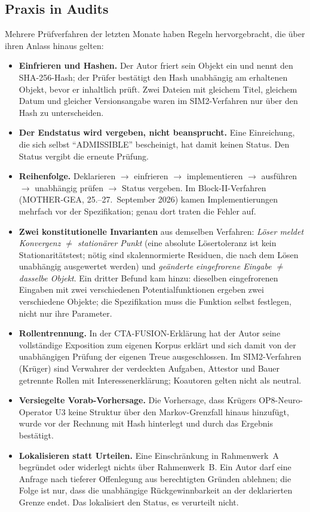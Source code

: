 \subsection{Praxis in Audits}

Mehrere Prüfverfahren der letzten Monate haben Regeln hervorgebracht, die über ihren Anlass
hinaus gelten:
\begin{itemize}
\item \textbf{Einfrieren und Hashen.} Der Autor friert sein Objekt ein und nennt den
  SHA-256-Hash; der Prüfer bestätigt den Hash unabhängig am erhaltenen Objekt, bevor er
  inhaltlich prüft. Zwei Dateien mit gleichem Titel, gleichem Datum und gleicher
  Versionsangabe waren im SIM2-Verfahren nur über den Hash zu unterscheiden.
\item \textbf{Der Endstatus wird vergeben, nicht beansprucht.} Eine Einreichung, die sich
  selbst \enquote{ADMISSIBLE} bescheinigt, hat damit keinen Status. Den Status vergibt die
  erneute Prüfung.
\item \textbf{Reihenfolge.} Deklarieren $\to$ einfrieren $\to$ implementieren $\to$ ausführen
  $\to$ unabhängig prüfen $\to$ Status vergeben. Im Block-II-Verfahren (MOTHER-GEA,
  25.--27.~September 2026) kamen Implementierungen mehrfach vor der Spezifikation; genau
  dort traten die Fehler auf.
\item \textbf{Zwei konstitutionelle Invarianten} aus demselben Verfahren: \emph{Löser meldet
  Konvergenz $\neq$ stationärer Punkt} (eine absolute Lösertoleranz ist kein
  Stationaritätstest; nötig sind skalennormierte Residuen, die nach dem Lösen unabhängig
  ausgewertet werden) und \emph{geänderte eingefrorene Eingabe $\neq$ dasselbe Objekt}.
  Ein dritter Befund kam hinzu: dieselben eingefrorenen Eingaben mit zwei verschiedenen
  Potentialfunktionen ergeben zwei verschiedene Objekte; die Spezifikation muss die
  Funktion selbst festlegen, nicht nur ihre Parameter.
\item \textbf{Rollentrennung.} In der CTA-FUSION-Erklärung hat der Autor seine vollständige
  Exposition zum eigenen Korpus erklärt und sich damit von der unabhängigen Prüfung der
  eigenen Treue ausgeschlossen. Im SIM2-Verfahren (Krüger) sind Verwahrer der verdeckten
  Aufgaben, Attestor und Bauer getrennte Rollen mit Interessenerklärung; Koautoren gelten
  nicht als neutral.
\item \textbf{Versiegelte Vorab-Vorhersage.} Die Vorhersage, dass Krügers OP8-Neuro-Operator
  U3 keine Struktur über den Markov-Grenzfall hinaus hinzufügt, wurde vor der Rechnung mit
  Hash hinterlegt und durch das Ergebnis bestätigt.
\item \textbf{Lokalisieren statt Urteilen.} Eine Einschränkung in Rahmenwerk~A begründet oder
  widerlegt nichts über Rahmenwerk~B. Ein Autor darf eine Anfrage nach tieferer
  Offenlegung aus berechtigten Gründen ablehnen; die Folge ist nur, dass die unabhängige
  Rückgewinnbarkeit an der deklarierten Grenze endet. Das lokalisiert den Status, es
  verurteilt nicht.
\end{itemize}

